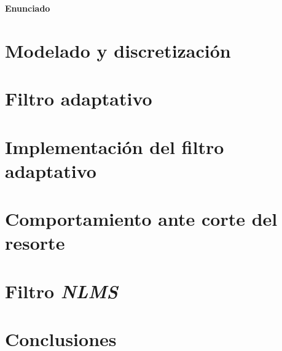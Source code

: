 \documentclass[10pt,a4paper]{article}
\begin{document}
		
	\setcounter{page}{1}

\begin{center}{\Large{\textbf{Enunciado}}}\end{center}
%	

	
	
	\section{Modelado y discretización}\label{sec:ej1}
	
		
	\section{Filtro adaptativo}\label{sec:ej2}
	

	\section{Implementación del filtro adaptativo}\label{sec:ej3}
		


	\pagebreak
	\section{Comportamiento ante corte del resorte}\label{sec:ej4}
		

	\pagebreak
	\section{Filtro \emph{NLMS}}\label{sec:ej5}
		

	\section{Conclusiones}\label{sec:conclusiones}
		

\end{document}
